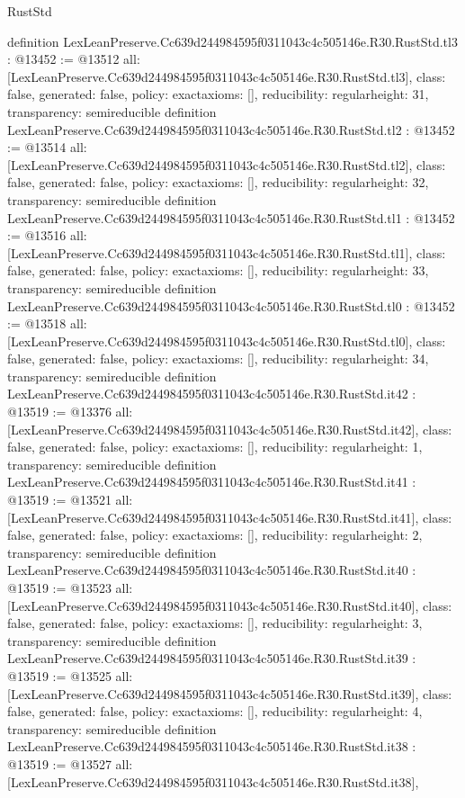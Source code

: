 \begin{lexlean}{RustStd}
\begin{coremodule}
{}
definition LexLeanPreserve.Cc639d244984595f0311043c4c505146e.R30.RustStd.tl3 : @13452 := @13512 {
  all: [LexLeanPreserve.Cc639d244984595f0311043c4c505146e.R30.RustStd.tl3],
  class: false,
  generated: false,
  policy: exact{axioms: []},
  reducibility: regular{height: 31},
  transparency: semireducible
}
definition LexLeanPreserve.Cc639d244984595f0311043c4c505146e.R30.RustStd.tl2 : @13452 := @13514 {
  all: [LexLeanPreserve.Cc639d244984595f0311043c4c505146e.R30.RustStd.tl2],
  class: false,
  generated: false,
  policy: exact{axioms: []},
  reducibility: regular{height: 32},
  transparency: semireducible
}
definition LexLeanPreserve.Cc639d244984595f0311043c4c505146e.R30.RustStd.tl1 : @13452 := @13516 {
  all: [LexLeanPreserve.Cc639d244984595f0311043c4c505146e.R30.RustStd.tl1],
  class: false,
  generated: false,
  policy: exact{axioms: []},
  reducibility: regular{height: 33},
  transparency: semireducible
}
definition LexLeanPreserve.Cc639d244984595f0311043c4c505146e.R30.RustStd.tl0 : @13452 := @13518 {
  all: [LexLeanPreserve.Cc639d244984595f0311043c4c505146e.R30.RustStd.tl0],
  class: false,
  generated: false,
  policy: exact{axioms: []},
  reducibility: regular{height: 34},
  transparency: semireducible
}
definition LexLeanPreserve.Cc639d244984595f0311043c4c505146e.R30.RustStd.it42 : @13519 := @13376 {
  all: [LexLeanPreserve.Cc639d244984595f0311043c4c505146e.R30.RustStd.it42],
  class: false,
  generated: false,
  policy: exact{axioms: []},
  reducibility: regular{height: 1},
  transparency: semireducible
}
definition LexLeanPreserve.Cc639d244984595f0311043c4c505146e.R30.RustStd.it41 : @13519 := @13521 {
  all: [LexLeanPreserve.Cc639d244984595f0311043c4c505146e.R30.RustStd.it41],
  class: false,
  generated: false,
  policy: exact{axioms: []},
  reducibility: regular{height: 2},
  transparency: semireducible
}
definition LexLeanPreserve.Cc639d244984595f0311043c4c505146e.R30.RustStd.it40 : @13519 := @13523 {
  all: [LexLeanPreserve.Cc639d244984595f0311043c4c505146e.R30.RustStd.it40],
  class: false,
  generated: false,
  policy: exact{axioms: []},
  reducibility: regular{height: 3},
  transparency: semireducible
}
definition LexLeanPreserve.Cc639d244984595f0311043c4c505146e.R30.RustStd.it39 : @13519 := @13525 {
  all: [LexLeanPreserve.Cc639d244984595f0311043c4c505146e.R30.RustStd.it39],
  class: false,
  generated: false,
  policy: exact{axioms: []},
  reducibility: regular{height: 4},
  transparency: semireducible
}
definition LexLeanPreserve.Cc639d244984595f0311043c4c505146e.R30.RustStd.it38 : @13519 := @13527 {
  all: [LexLeanPreserve.Cc639d244984595f0311043c4c505146e.R30.RustStd.it38],
}
\end{coremodule}
\end{lexlean}
